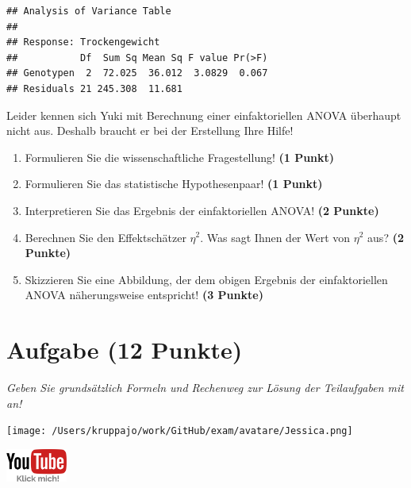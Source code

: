 \documentclass[a4paper, 9pt]{scrartcl}\usepackage[]{graphicx}\usepackage[]{xcolor}
\makeatletter
\newenvironment{kframe}{%
 \def\at@end@of@kframe{}%
 \ifinner\ifhmode%
  \def\at@end@of@kframe{\end{minipage}}%
  \begin{minipage}{\columnwidth}%
 \fi\fi%
 \def\FrameCommand##1{\hskip\@totalleftmargin \hskip-\fboxsep
 \colorbox{shadecolor}{##1}\hskip-\fboxsep
     \hskip-\linewidth \hskip-\@totalleftmargin \hskip\columnwidth}%
 \MakeFramed {\advance\hsize-\width
   \@totalleftmargin\z@ \linewidth\hsize
   \@setminipage}}%
 {\par\unskip\endMakeFramed%
 \at@end@of@kframe}
\newenvironment{knitrout}{}{} %
\makeatother
\begin{document}
\begin{knitrout}
\color{fgcolor}\begin{kframe}
\begin{verbatim}
## Analysis of Variance Table
## 
## Response: Trockengewicht
##           Df  Sum Sq Mean Sq F value Pr(>F)
## Genotypen  2  72.025  36.012  3.0829  0.067
## Residuals 21 245.308  11.681
\end{verbatim}
\end{kframe}
\end{knitrout}

\vspace{1ex}

Leider kennen sich Yuki mit Berechnung einer einfaktoriellen ANOVA überhaupt nicht aus. Deshalb braucht er bei der Erstellung Ihre Hilfe! 

\begin{enumerate}
  \item Formulieren Sie die wissenschaftliche Fragestellung! \textbf{(1 Punkt)}
  \item Formulieren Sie das statistische Hypothesenpaar! \textbf{(1 Punkt)}
\item Interpretieren Sie das Ergebnis der einfaktoriellen ANOVA! \textbf{(2 Punkte)} 
\item Berechnen Sie den Effektschätzer $\eta^2$. Was sagt Ihnen der Wert von $\eta^2$ aus? \textbf{(2 Punkte)}
\item Skizzieren Sie eine Abbildung, der dem obigen Ergebnis der
  einfaktoriellen ANOVA näherungsweise entspricht! \textbf{(3 Punkte)}
\end{enumerate}

 
\clearpage

\section{Aufgabe \hfill (12 Punkte)}

\textit{Geben Sie grundsätzlich Formeln und Rechenweg zur Lösung der Teilaufgaben mit an!} \\[1Ex]
 

 
\begin{minipage}[t]{0.5\textwidth}
\texttt{[image: /Users/kruppajo/work/GitHub/exam/avatare/Jessica.png]}
\end{minipage}
\begin{minipage}[t]{0.5\textwidth}
\hfill
\href{https://youtu.be/8Pb2sKUIMyk}{\includegraphics[width = 2cm]{img/youtube}}
\end{minipage}
\vspace{-3Ex}
\end{document}
